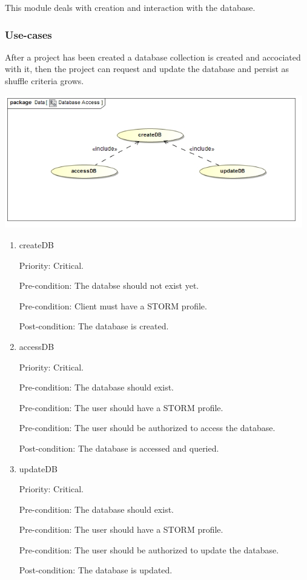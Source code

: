 This module deals with creation and interaction with the database.

\subsubsection{Use-cases}
After a project has been created a database collection is created and accociated with it, then the project can request and update the database and persist as shuffle criteria grows.\par
\includegraphics[width=13cm]{./graphics/databaseAccessUseCase.jpg}
    \rule{0\linewidth}{0.15\linewidth}\par
\begin{enumerate}
\item createDB\par
Priority: Critical.\par
Pre-condition: The databse should not exist yet.\par
Pre-condition: Client must have a STORM profile.\par
Post-condition: The database is created.\par

\item accessDB\par
Priority: Critical.\par
Pre-condition: The database should exist.\par
Pre-condition: The user should have a STORM profile.\par
Pre-condition: The user should be authorized to access the database.\par
Post-condition: The database is accessed and queried.\par

\item updateDB\par
Priority: Critical.\par
Pre-condition: The database should exist.\par
Pre-condition: The user should have a STORM profile.\par
Pre-condition: The user should be authorized to update the database.\par
Post-condition: The database is updated.\par

\end{enumerate}